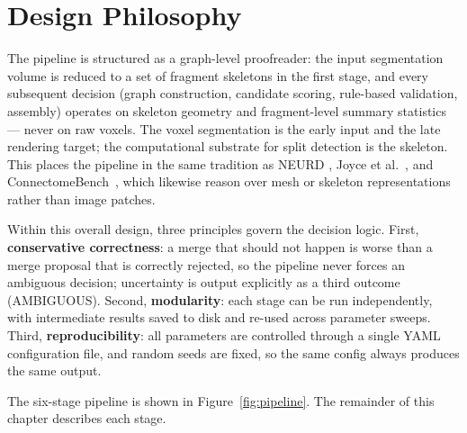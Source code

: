 \section{Design Philosophy}

The pipeline is structured as a graph-level proofreader: the input segmentation
volume is reduced to a set of fragment skeletons in the first stage, and every
subsequent decision (graph construction, candidate scoring, rule-based
validation, assembly) operates on skeleton geometry and fragment-level summary
statistics --- never on raw voxels. The voxel segmentation is the early input
and the late rendering target; the computational substrate for split detection
is the skeleton. This places the pipeline in the same tradition as NEURD
\cite{celii2025neurd}, Joyce et al.~\cite{joyce2023mesh}, and
ConnectomeBench~\cite{brown2025connectomebench}, which likewise reason over
mesh or skeleton representations rather than image patches.

Within this overall design, three principles govern the decision logic. First,
\textbf{conservative correctness}: a merge that should not happen is worse
than a merge proposal that is correctly rejected, so the pipeline never forces
an ambiguous decision; uncertainty is output explicitly as a third outcome
(AMBIGUOUS). Second, \textbf{modularity}: each stage can be run independently,
with intermediate results saved to disk and re-used across parameter sweeps.
Third, \textbf{reproducibility}: all parameters are controlled through a
single YAML configuration file, and random seeds are fixed, so the same
config always produces the same output.

The six-stage pipeline is shown in Figure~\ref{fig:pipeline}. The remainder
of this chapter describes each stage.

